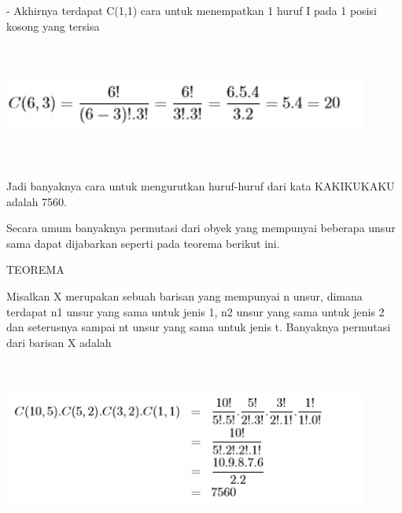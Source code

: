 \documentclass[11pt,fleqn]{book} %
\begin{document}
- Akhirnya terdapat C(1,1) cara untuk menempatkan 1 huruf I pada 1 posisi kosong yang tersisa

 
\includegraphics[width = 12cm, height= 4cm]{Pictures/herlin11.png}

Jadi banyaknya cara untuk mengurutkan huruf-huruf dari kata KAKIKUKAKU adalah 7560.

Secara umum banyaknya permutasi dari obyek yang mempunyai beberapa unsur sama dapat dijabarkan seperti pada teorema berikut ini.

TEOREMA

Misalkan X merupakan sebuah barisan yang mempunyai n unsur, dimana terdapat n1 unsur yang sama untuk jenis 1, n2 unsur yang sama untuk jenis 2 dan seterusnya sampai nt unsur yang sama untuk jenis t. Banyaknya permutasi dari barisan X adalah

\includegraphics[width = 12cm, height= 6cm]{Pictures/herlin12.png}
\end{document}
